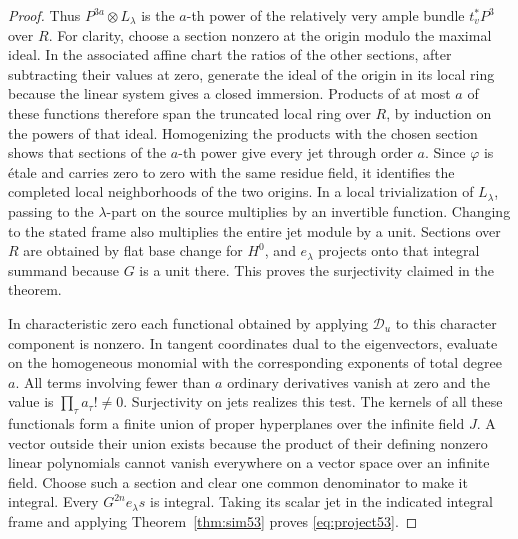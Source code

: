 \documentclass[a4paper,11pt]{article}
\theoremstyle{definition}
\theoremstyle{remark}
\numberwithin{equation}{section}
\begin{document}
\begin{proof}
Thus \(P^{3a}\otimes L_\lambda\) is the \(a\)-th power of the
relatively very ample bundle \(t_v^*P^3\) over \(R\). For clarity,
choose a section nonzero at the origin modulo the maximal ideal.
In the associated affine chart the ratios of the other sections,
after subtracting their values at zero, generate the ideal of the
origin in its local ring because the linear system gives a closed
immersion. Products of at most \(a\) of these functions therefore
span the truncated local ring over \(R\), by induction on the
powers of that ideal. Homogenizing the products with the chosen
section shows that sections of the \(a\)-th power give every jet
through order \(a\). Since \(\varphi\) is \'etale and carries zero
to zero with the same residue field, it identifies the completed
local neighborhoods of the two origins. In a local trivialization
of \(L_\lambda\), passing to the \(\lambda\)-part on the source
multiplies by an invertible function. Changing to the stated frame
also multiplies the entire jet module by a unit. Sections over \(R\)
are obtained by flat base change for \(H^0\), and \(e_\lambda\)
projects onto that integral summand because \(G\) is a unit there.
This proves the surjectivity claimed in the theorem.

In characteristic zero each functional obtained by applying
\(\mathcal D_u\) to this character component is nonzero. In tangent
coordinates dual to the eigenvectors, evaluate on the homogeneous
monomial with the corresponding exponents of total degree \(a\).
All terms involving fewer than \(a\) ordinary derivatives vanish at
zero and the value is \(\prod_\tau a_\tau!\ne0\).
Surjectivity on jets realizes this test. The kernels of all these
functionals form a finite union of proper hyperplanes over the
infinite field \(J\). A vector outside their union exists because
the product of their defining nonzero linear polynomials cannot
vanish everywhere on a vector space over an infinite field.
Choose such a section and clear one common denominator to make it
integral. Every \(G^{2n}e_\lambda s\) is integral. Taking its
scalar jet in the indicated integral frame and applying
Theorem~\ref{thm:sim53} proves \eqref{eq:project53}.
\end{proof}
\end{document}
